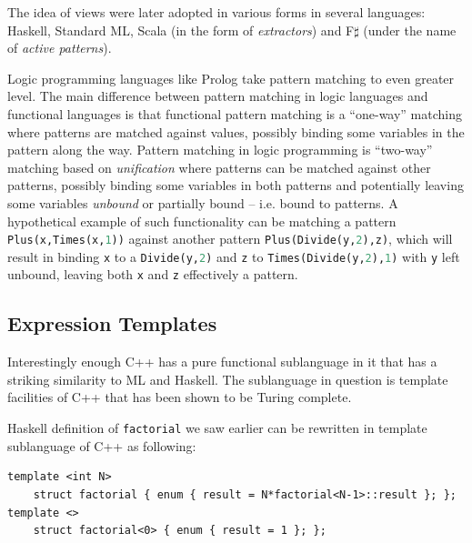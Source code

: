 \documentclass[preprint]{sigplanconf}
\makeatletter
\DeclareRobustCommand{\code}[1]{{\lstinline[breaklines=false,escapechar=@]{#1}}}
\DeclareRobustCommand{\codeocaml}[1]{{\lstinline[breaklines=false,language=Caml]{#1}}}
\makeatother
\begin{document}
\noindent
The idea of views were later adopted in various forms in several languages: 
Haskell\cite{views96}, Standard ML\cite{views98}, Scala (in the form of 
\emph{extractors}\cite{EmirThesis}) and F$\sharp$ (under the name of 
\emph{active patterns}\cite{Syme07}).


Logic programming languages like Prolog take pattern matching to even greater 
level. The main difference between pattern matching in logic languages and 
functional languages is that functional pattern matching is a ``one-way'' 
matching where patterns are matched against values, possibly binding some 
variables in the pattern along the way. Pattern matching in logic programming is 
``two-way'' matching based on \emph{unification} where patterns can be matched 
against other patterns, possibly binding some variables in both patterns and 
potentially leaving some variables \emph{unbound} or partially bound -- i.e. 
bound to patterns. A hypothetical example of such functionality can be matching 
a pattern \codeocaml{Plus(x,Times(x,1))} against another pattern 
\codeocaml{Plus(Divide(y,2),z)}, which will result in binding \codeocaml{x} to a 
\codeocaml{Divide(y,2)} and \codeocaml{z} to \codeocaml{Times(Divide(y,2),1)} 
with \codeocaml{y} left unbound, leaving both \codeocaml{x} and \codeocaml{z} 
effectively a pattern.

\subsection{Expression Templates}

Interestingly enough C++ has a pure functional sublanguage in it that has a 
striking similarity to ML and Haskell. The sublanguage in question is template 
facilities of C++ that has been shown to be Turing 
complete\cite{veldhuizen:templates_turing_complete}. 

Haskell definition of \code{factorial} we saw earlier can be rewritten in 
template sublanguage of C++ as following:

\begin{lstlisting}
template <int N> 
    struct factorial { enum { result = N*factorial<N-1>::result }; };
template <>
    struct factorial<0> { enum { result = 1 }; };
\end{lstlisting}
\end{document}
